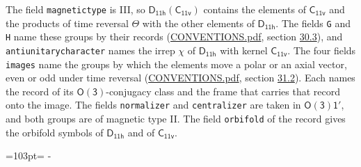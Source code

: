 \documentclass[10pt,a4paper]{article}
\newcommand{\needspace}[1]{\par\penalty-100\begingroup\dimen0=#1\relax\dimen2=\pagegoal
  \advance\dimen2-\pagetotal\ifdim\dimen0>\dimen2\relax\ifdim\dimen2>0pt\vfil\break\fi\fi
  \endgroup}
\numberwithin{equation}{section}
\newcommand{\grp}[1]{\mathsf{#1}}
\begin{document}
The field \texttt{magnetictype} is III, so $\grp{D_{11h}}(\grp{C_{11v}})$ contains the elements of $\grp{C_{11v}}$ and the products of time reversal $\varTheta$ with the other elements of $\grp{D_{11h}}$. The fields \texttt{G} and \texttt{H} name these groups by their records (\href{../../CONVENTIONS.pdf}{CONVENTIONS.pdf}, section \href{../../CONVENTIONS.pdf\#conv.30.3}{30.3}), and \texttt{antiunitarycharacter} names the irrep $\chi$ of $\grp{D_{11h}}$ with kernel $\grp{C_{11v}}$. The four fields \texttt{images} name the groups by which the elements move a polar or an axial vector, even or odd under time reversal (\href{../../CONVENTIONS.pdf}{CONVENTIONS.pdf}, section \href{../../CONVENTIONS.pdf\#conv.31.2}{31.2}). Each names the record of its $\grp{O(3)}$-conjugacy class and the frame that carries that record onto the image. The fields \texttt{normalizer} and \texttt{centralizer} are taken in $\grp{O(3)1'}$, and both groups are of magnetic type II. The field \texttt{orbifold} of the record gives the orbifold symbols of $\grp{D_{11h}}$ and of $\grp{C_{11v}}$.
\needspace{103pt}
\end{document}
